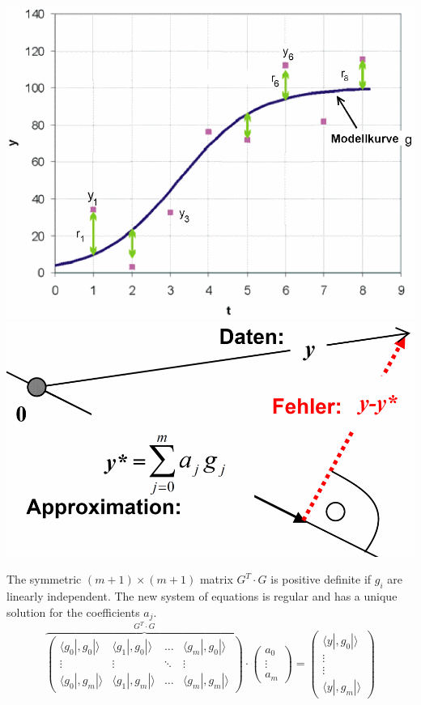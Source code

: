 \begin{minipage}[c]{6.5cm}
\includegraphics[width=\textwidth]{bilder/leastSquare}\\

\includegraphics[width=1\textwidth,trim=-3cm 0cm 0cm 0cm]{bilder/leastSquareOrth}
\end{minipage}

The symmetric $(m+1)\times(m+1)$ matrix $G^T \cdot G$ is positive definite if $g_i$ are linearly independent.
The new system of equations is regular and has a unique solution for the coefficients $a_j$.
\[
    \overbrace{
    \begin{pmatrix}
        \langle g_0|,g_0|\rangle & \langle g_1|,g_0|\rangle & \ldots & \langle g_m|,g_0|\rangle \\
        \vdots & \vdots & \ddots & \vdots \\
        \langle g_0|,g_m|\rangle & \langle g_1|,g_m|\rangle & \ldots & \langle g_m|,g_m|\rangle
    \end{pmatrix}
    }^{G^T \cdot G}
    \cdot
    \begin{pmatrix}
        a_0 \\ \vdots \\ a_m
    \end{pmatrix}
    =
    \begin{pmatrix}
        \langle y|,g_0 |\rangle \\ \vdots \\ \vdots \\ \langle y|,g_m| \rangle
    \end{pmatrix}
\]

